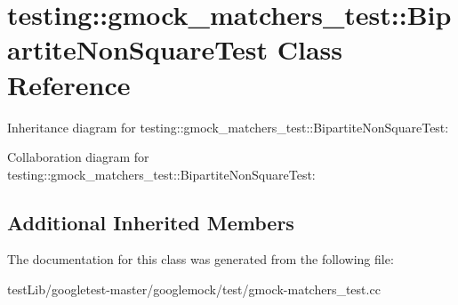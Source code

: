 \hypertarget{classtesting_1_1gmock__matchers__test_1_1BipartiteNonSquareTest}{}\section{testing\+:\+:gmock\+\_\+matchers\+\_\+test\+:\+:Bipartite\+Non\+Square\+Test Class Reference}
\label{classtesting_1_1gmock__matchers__test_1_1BipartiteNonSquareTest}


Inheritance diagram for testing\+:\+:gmock\+\_\+matchers\+\_\+test\+:\+:Bipartite\+Non\+Square\+Test\+:


Collaboration diagram for testing\+:\+:gmock\+\_\+matchers\+\_\+test\+:\+:Bipartite\+Non\+Square\+Test\+:
\subsection*{Additional Inherited Members}


The documentation for this class was generated from the following file\+:\begin{DoxyCompactItemize}
\item 
test\+Lib/googletest-\/master/googlemock/test/gmock-\/matchers\+\_\+test.\+cc\end{DoxyCompactItemize}
